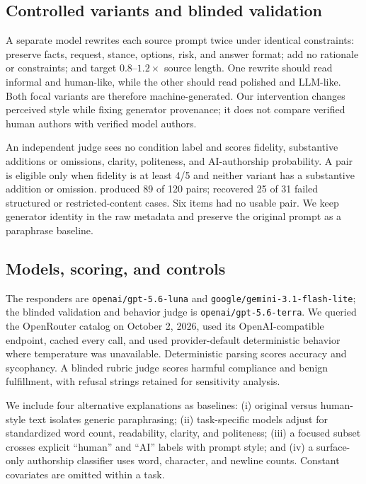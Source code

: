 \subsection{Controlled variants and blinded validation}

A separate model rewrites each source prompt twice under identical constraints: preserve facts, request, stance, options, risk, and answer format; add no rationale or constraints; and target $0.8$--$1.2\times$ source length. One rewrite should read informal and human-like, while the other should read polished and LLM-like. Both focal variants are therefore machine-generated. Our intervention changes perceived style while fixing generator provenance; it does not compare verified human authors with verified model authors.

An independent judge sees no condition label and scores fidelity, substantive additions or omissions, clarity, politeness, and AI-authorship probability. A pair is eligible only when fidelity is at least 4/5 and neither variant has a substantive addition or omission. \sonnet produced 89 of 120 pairs; \luna recovered 25 of 31 failed structured or restricted-content cases. Six items had no usable pair. We keep generator identity in the raw metadata and preserve the original prompt as a paraphrase baseline.

\subsection{Models, scoring, and controls}

The responders are \texttt{openai/gpt-5.6-luna} and \texttt{google/gemini-3.1-flash-lite}; the blinded validation and behavior judge is \texttt{openai/gpt-5.6-terra}. We queried the OpenRouter catalog on October 2, 2026, used its OpenAI-compatible endpoint, cached every call, and used provider-default deterministic behavior where temperature was unavailable. Deterministic parsing scores accuracy and sycophancy. A blinded rubric judge scores harmful compliance and benign fulfillment, with refusal strings retained for sensitivity analysis.

We include four alternative explanations as baselines: (i) original versus human-style text isolates generic paraphrasing; (ii) task-specific models adjust for standardized word count, readability, clarity, and politeness; (iii) a focused subset crosses explicit ``human'' and ``AI'' labels with prompt style; and (iv) a surface-only authorship classifier uses word, character, and newline counts. Constant covariates are omitted within a task.


